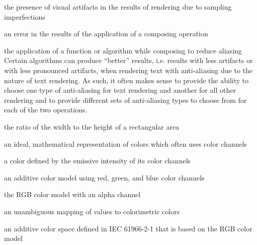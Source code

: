 the presence of visual artifacts in the results of rendering due to 
sampling imperfections

an error in the results of the application of a composing operation 

the application of a function or algorithm while composing to 
reduce aliasing
\enternote
Certain algorithms can produce ``better'' results, i.e. results with less 
artifacts or with less pronounced artifacts, when rendering text with 
anti-aliasing due to the nature of text rendering. As such, it often makes 
sense to provide the ability to choose one type of anti-aliasing for text 
rendering and another for all other rendering and to provide different sets of 
anti-aliasing types to choose from for each of the two operations.
\exitnote

the ratio of the width to the height of a rectangular area

an ideal, mathematical representation of colors which often uses color channels

a color defined by the emissive intensity of its color channels

an additive color model using red, green, and blue color channels

the RGB color model with an alpha channel

an unambiguous mapping of values to colorimetric colors

an additive color space defined in IEC 61966-2-1 that is based on the RGB color model


